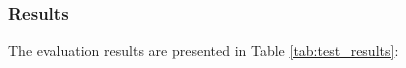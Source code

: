 %







\subsubsection{Results}
The evaluation results are presented in Table \ref{tab:test_results}:

